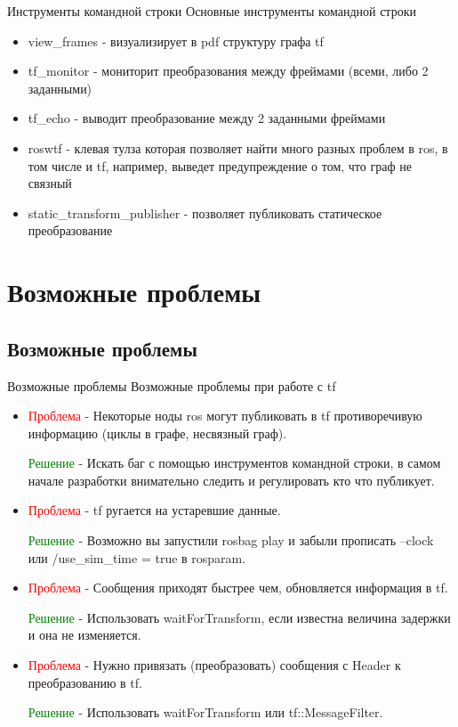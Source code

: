 \documentclass[9pt]{beamer}
\begin{document}
\begin{frame}{Инструменты командной строки}
Основные инструменты командной строки 
  \begin{itemize}
    \item
    {
      view\_frames - визуализирует в pdf структуру графа tf
    }
    \item
    {
      tf\_monitor - мониторит преобразования между фреймами (всеми, либо 2 заданными) 
    }
    \item
    {
      tf\_echo - выводит преобразование между 2 заданными фреймами
    }
    \item
    {
      roswtf - клевая тулза которая позволяет найти много разных проблем в ros, в том числе и tf, например, выведет предупреждение о том, что граф не связный
    }
    \item
    {
      static\_transform\_publisher - позволяет публиковать статическое преобразование
    }
  \end{itemize}
\end{frame}

\section{Возможные проблемы}
\subsection{Возможные проблемы}

\begin{frame}{Возможные проблемы}
Возможные проблемы при работе с tf
  \begin{itemize}
    \item
    {
      \textcolor{red}{Проблема} - Некоторые ноды ros могут публиковать в tf противоречивую информацию (циклы в графе, несвязный граф).

      \textcolor{green}{Решение} - Искать баг с помощью инструментов командной строки, в самом начале разработки внимательно следить и регулировать кто что публикует.
    }
    \item
    {
      \textcolor{red}{Проблема} - tf ругается на устаревшие данные.

      \textcolor{green}{Решение} - Возможно вы запустили rosbag play и забыли прописать --clock или /use\_sim\_time = true в rosparam.
    }
    \item
    {
      \textcolor{red}{Проблема} - Сообщения приходят быстрее чем, обновляется информация в tf. 

      \textcolor{green}{Решение} - Использовать waitForTransform, если известна величина задержки и она не изменяется.
    }
    \item
    {
      \textcolor{red}{Проблема} - Нужно привязать (преобразовать) сообщения с Header к преобразованию в tf. 

      \textcolor{green}{Решение} - Использовать waitForTransform или tf::MessageFilter.
    }
  \end{itemize}
\end{frame}
\end{document}
